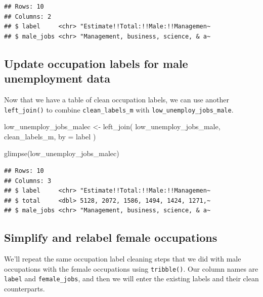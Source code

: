 \documentclass[
  krantz2]{krantz}
\makeatletter
\newenvironment{Shaded}{\begin{snugshade}}{\end{snugshade}}
\newcommand{\AttributeTok}[1]{\textcolor[rgb]{0.61,0.61,0.61}{#1}}
\newcommand{\FunctionTok}[1]{\textcolor[rgb]{0,0,0}{#1}}
\newcommand{\NormalTok}[1]{#1}
\newcommand{\OtherTok}[1]{\textcolor[rgb]{0.37,0.37,0.37}{#1}}
\newcommand{\StringTok}[1]{\textcolor[rgb]{0.5,0.5,0.5}{#1}}
\newenvironment{kframe}{%
\medskip{}
\setlength{\fboxsep}{.8em}
 \def\at@end@of@kframe{}%
 \ifinner\ifhmode%
  \def\at@end@of@kframe{\end{minipage}}%
  \begin{minipage}{\columnwidth}%
 \fi\fi%
 \def\FrameCommand##1{\hskip\@totalleftmargin \hskip-\fboxsep
 \colorbox{shadecolor}{##1}\hskip-\fboxsep
     \hskip-\linewidth \hskip-\@totalleftmargin \hskip\columnwidth}%
 \MakeFramed {\advance\hsize-\width
   \@totalleftmargin\z@ \linewidth\hsize
   \@setminipage}}%
 {\par\unskip\endMakeFramed%
 \at@end@of@kframe}
\renewenvironment{Shaded}{\begin{kframe}}{\end{kframe}}
\makeatother
\begin{document}
\begin{verbatim}
## Rows: 10
## Columns: 2
## $ label     <chr> "Estimate!!Total:!!Male:!!Managemen~
## $ male_jobs <chr> "Management, business, science, & a~
\end{verbatim}

\hypertarget{update-occupation-labels-for-male-unemployment-data}{%
\subsection{Update occupation labels for male unemployment data}\label{update-occupation-labels-for-male-unemployment-data}}

Now that we have a table of clean occupation labels, we can use another \texttt{left\_join()} to combine \texttt{clean\_labels\_m} with \texttt{low\_unemploy\_jobs\_male}.

\begin{Shaded}
\begin{Highlighting}[]
\NormalTok{low\_unemploy\_jobs\_malec }\OtherTok{\textless{}{-}} \FunctionTok{left\_join}\NormalTok{(}
\NormalTok{  low\_unemploy\_jobs\_male,}
\NormalTok{  clean\_labels\_m,}
  \AttributeTok{by =} \StringTok{\textquotesingle{}label\textquotesingle{}}
\NormalTok{  )}

\FunctionTok{glimpse}\NormalTok{(low\_unemploy\_jobs\_malec)}
\end{Highlighting}
\end{Shaded}

\begin{verbatim}
## Rows: 10
## Columns: 3
## $ label     <chr> "Estimate!!Total:!!Male:!!Managemen~
## $ total     <dbl> 5128, 2072, 1586, 1494, 1424, 1271,~
## $ male_jobs <chr> "Management, business, science, & a~
\end{verbatim}

\hypertarget{simplify-and-relabel-female-occupations}{%
\subsection{Simplify and relabel female occupations}\label{simplify-and-relabel-female-occupations}}

We'll repeat the same occupation label cleaning steps that we did with male occupations with the female occupations using \texttt{tribble()}. Our column names are \texttt{label} and \texttt{female\_jobs}, and then we will enter the existing labels and their clean counterparts.
\end{document}
